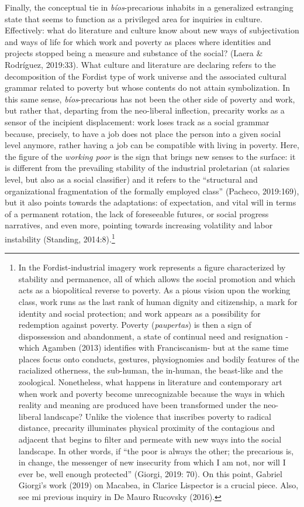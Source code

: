 \documentclass[a4paper,]{scrartcl}
\begin{document}
Finally, the conceptual tie in \emph{bíos}-precarious inhabits in a
generalized estranging state that seems to function as a privileged area
for inquiries in culture. Effectively: what do literature and culture
know about new ways of subjectivation and ways of life for which work
and poverty as places where identities and projects stopped being a
measure and substance of the social? (Laera \& Rodríguez, 2019:33). What
culture and literature are declaring refers to the decomposition of the
Fordist type of work universe and the associated cultural grammar
related to poverty but whose contents do not attain symbolization. In
this same sense, \emph{bíos}-precarious has not been the other side of
poverty and work, but rather that, departing from the neo-liberal
inflection, precarity works as a sensor of the incipient displacement:
work loses track as a social grammar because, precisely, to have a job
does not place the person into a given social level anymore, rather
having a job can be compatible with living in poverty. Here, the figure
of the \emph{working poor} is the sign that brings new senses to the
surface: it is different from the prevailing stability of the industrial
proletarian (at salaries level, but also as a social classifier) and it
refers to the ``structural and organizational fragmentation of the
formally employed class'' (Pacheco, 2019:169), but it also points
towards the adaptations: of expectation, and vital will in terms of a
permanent rotation, the lack of foreseeable futures, or social progress
narratives, and even more, pointing towards increasing volatility and
labor instability (Standing, 2014:8).\footnote{In the Fordist-industrial
  imagery work represents a figure characterized by stability and
  permanence, all of which allows the social promotion and which acts as
  a biopolitical reverse to poverty. As a pious vision upon the working
  class, work runs as the last rank of human dignity and citizenship, a
  mark for identity and social protection; and work appears as a
  possibility for redemption against poverty. Poverty (\emph{paupertas})
  is then a sign of dispossession and abandonment, a state of continual
  need and resignation -which Agamben (2013) identifies with
  Franciscanism- but at the same time places focus onto conducts,
  gestures, physiognomies and bodily features of the racialized
  otherness, the sub-human, the in-human, the beast-like and the
  zoological. Nonetheless, what happens in literature and contemporary
  art when work and poverty become unrecognizable because the ways in
  which reality and meaning are produced have been transformed under the
  neo-liberal landscape? Unlike the violence that inscribes poverty to
  radical distance, precarity illuminates physical proximity of the
  contagious and adjacent that begins to filter and permeate with new
  ways into the social landscape. In other words, if ``the poor is
  always the other; the precarious is, in change, the messenger of new
  insecurity from which I am not, nor will I ever be, well enough
  protected'' (Giorgi, 2019: 70). On this point, Gabriel Giorgi's work
  (2019) on Macabea, in Clarice Lispector is a crucial piece. Also, see
  mi previous inquiry in De Mauro Rucovsky (2016).}
\end{document}
